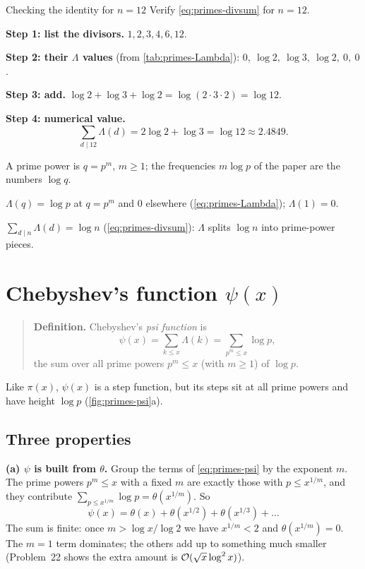 \begin{sample}{Checking the identity for $n=12$}
Verify \cref{eq:primes-divsum} for $n=12$.

\textbf{Step 1: list the divisors.} $1,2,3,4,6,12$.

\textbf{Step 2: their $\Lambda$ values} (from \cref{tab:primes-Lambda}): $0,\ \log2,\ \log3,\ \log2,\ 0,\ 0$.

\textbf{Step 3: add.} $\log2+\log3+\log2=\log(2\cdot3\cdot2)=\log12$.

\textbf{Step 4: numerical value.}
\[
\boxed{\sum_{d\mid12}\Lambda(d)=2\log2+\log3=\log12\approx2.4849.}
\]
\end{sample}

\begin{keyideas}
\item A prime power is $q=p^m$, $m\ge1$; the frequencies $m\log p$ of the paper are the numbers $\log q$.
\item $\Lambda(q)=\log p$ at $q=p^m$ and $0$ elsewhere (\cref{eq:primes-Lambda}); $\Lambda(1)=0$.
\item $\sum_{d\mid n}\Lambda(d)=\log n$ (\cref{eq:primes-divsum}): $\Lambda$ splits $\log n$ into prime-power pieces.
\end{keyideas}

\section{Chebyshev's function $\psi(x)$}\label{sec:primes-psi}

\begin{quote}
\textbf{Definition.} Chebyshev's \emph{psi function} is
\begin{equation}
\psi(x)=\sum_{k\le x}\Lambda(k)=\sum_{p^m\le x}\log p ,
\label{eq:primes-psi}
\end{equation}
the sum over all prime powers $p^m\le x$ (with $m\ge1$) of $\log p$.
\end{quote}

Like $\pi(x)$, $\psi(x)$ is a step function, but its steps sit at all prime powers and have height $\log p$ (\cref{fig:primes-psi}a).

\subsection{Three properties}

\textbf{(a) $\psi$ is built from $\theta$.} Group the terms of \cref{eq:primes-psi} by the exponent $m$. The prime powers $p^m\le x$ with a fixed $m$ are exactly those with $p\le x^{1/m}$, and they contribute $\sum_{p\le x^{1/m}}\log p=\theta(x^{1/m})$. So
\begin{equation}
\psi(x)=\theta(x)+\theta(x^{1/2})+\theta(x^{1/3})+\dots
\label{eq:primes-psitheta}
\end{equation}
The sum is finite: once $m>\log x/\log2$ we have $x^{1/m}<2$ and $\theta(x^{1/m})=0$. The $m=1$ term dominates; the others add up to something much smaller (Problem~22 shows the extra amount is $\mathcal{O}(\sqrt x\log^2x)$).

